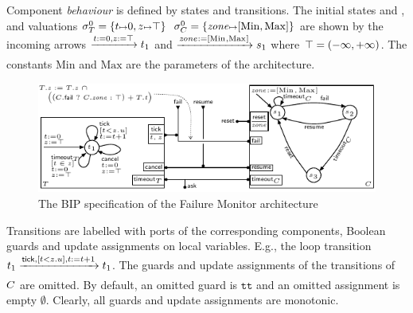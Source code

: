 \documentclass{llncs}
\newcommand{\Ludo}{\\\hfill\mdash Ludo}
\newcommand{\noteLH}[2][color=orange!40, size=\tiny]{\todo[#1]{{#2}\Ludo}}
\newcommand{\mdash}[1][]{---#1}
\newcommand{\ie}[1][\ ]{i.e.#1}
\newcommand{\Eg}[1][\ ]{E.g.#1}
\newcommand{\goesto}[2][]{\ensuremath{\xrightarrow[{#1}\relax]{#2}}}
\newcommand{\true} {\ensuremath{\mathtt{t\!t}}}
\newcommand{\noop} {\ensuremath{\emptyset}} %
\newcommand{\val}[3][]{\ensuremath{#1{\sigma}^{#2}_{#3}}}
\begin{document}
Component \emph{behaviour} is defined by states %
and transitions.
The initial states
 and , and valuations $\val{0}{\NameTimer} = \{t
\mapsto 0, z \mapsto \topinterval\}$
$\val{0}{\NameCtrl} =
\{\mathit{zone} \mapsto [\mathrm{Min}, \mathrm{Max}]\}$ are shown by
the incoming arrows $\goesto{\TimerInit[]} \tstate{0}$ and
$\goesto{\IntervalInit[]} \cstate{0}$ where $\top=(-\infty, +\infty)$.
The constants $\mathrm{Min}$ and $\mathrm{Max}$ are the parameters
of the architecture.





\begin{figure}[t]
  \centering
  \includegraphics[width=0.9\columnwidth]{BIPspec-ArchFailureTimerMax-v4}
  \caption{The BIP specification of the Failure Monitor architecture}
  \label{fig:schema:ArchFailure:BIP}
\end{figure}



Transitions are labelled with ports of the
corresponding components, Boolean guards and update assignments on local
variables.  \Eg[,] the loop transition $\tstate{0}
\goesto{\PortTick, \GuardTick[], \TimerUpd[]} \tstate{0}$. %
The
guards and update assignments of the transitions of $C$ are
omitted. By default, an omitted guard is  $\true$ and an omitted assignment is empty {\noop}.  
%
Clearly, all guards and update assignments are monotonic.
\end{document}
